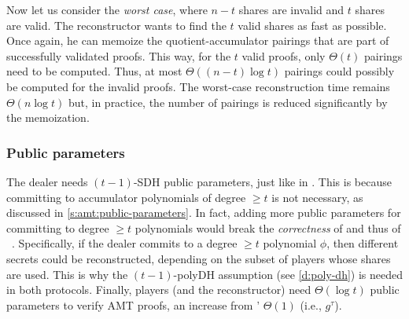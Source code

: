Now let us consider the \textit{worst case}, where $n-t$ shares are invalid and $t$ shares are valid.
The reconstructor wants to find the $t$ valid shares as fast as possible.
Once again, he can memoize the quotient-accumulator pairings that are part of successfully validated proofs.
This way, for the $t$ valid proofs, only $\Theta(t)$ pairings need to be computed.
Thus, at most $\Theta((n-t)\log{t})$ pairings could possibly be computed for the invalid proofs.
The worst-case reconstruction time remains $\Theta(n\log{t})$ but, in practice, the number of pairings is reduced significantly by the memoization.

\subsubsection{Public parameters}
\label{s:scalable-vss:public-params}
The \ourvss dealer needs $(t-1)$-SDH public parameters, just like in \evss.
This is because committing to accumulator polynomials of degree $\ge t$ is not necessary, as discussed in \cref{s:amt:public-parameters}.
In fact, adding more public parameters for committing to degree $\ge t$ polynomials would break the \textit{correctness} of \evss and thus of \ourvss~\cite{polycommit}.
Specifically, if the dealer commits to a degree $\ge t$ polynomial $\phi$, then different secrets could be reconstructed, depending on the subset of players whose shares are used.
This is why the $(t-1)$-polyDH assumption (see \cref{d:poly-dh}) is needed in both protocols.
Finally, \ourvss players (and the reconstructor) need $\Theta(\log{t})$ public parameters to verify AMT proofs, an increase from \evss' $\Theta(1)$ (i.e., $g^\tau$).
